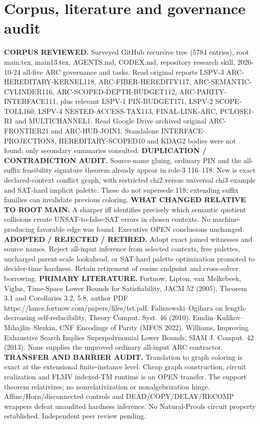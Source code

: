 \documentclass[11pt]{article}
\begin{document}
\section{Corpus, literature and governance audit}
\noindent\textbf{CORPUS REVIEWED.} Surveyed GitHub recursive tree (5784 entries), root main.tex, main13.tex, AGENTS.md, CODEX.md, repository research skill, 2026-10-24 all-five ARC governance and tasks. Read original reports LSPV-3 ARC-HEREDITARY-KERNEL118, ARC-FIBER-HEREDITY117, ARC-SEMANTIC-CYLINDER116, ARC-SCOPED-DEPTH-BUDGET112, ARC-PARITY-INTERFACE111, plus relevant LSPV-1 PIN-BUDGET171, LSPV-2 SCOPE-TOLL160, LSPV-4 NESTED-ACCESS-TAX113, FINAL-LINK-ARC, PCLOSE1-R1 and MULTICHANNEL1. Read Google Drive archived original ARC-FRONTIER21 and ARC-HUB-JOIN1. Standalone INTERFACE-PROJECTION8, HEREDITARY-SCOPED10 and KDAG2 bodies were not found; only secondary summaries consulted.
\noindent\textbf{DUPLICATION / CONTRADICTION AUDIT.} Source-name gluing, ordinary PIN and the all-suffix feasibility signature theorem already appear in role-3 116--118. New is exact declared-context conflict graph, with restricted chi2 versus universal chi3 example and SAT-hard implicit palette. These do not supersede 118; extending suffix families can invalidate previous coloring.
\noindent\textbf{WHAT CHANGED RELATIVE TO ROOT MAIN.} A sharper iff identifies precisely which semantic quotient collisions create UNSAT-to-false-SAT errors in chosen contexts. No machine-producing favorable edge was found. Executive OPEN conclusions unchanged.
\noindent\textbf{ADOPTED / REJECTED / RETIRED.} Adopt exact joined witnesses and source names. Reject all-input inference from selected contexts, free palettes, uncharged parent-scale lookahead, or SAT-hard palette optimization promoted to decider-time hardness. Retain retirement of cosine endpoint and cross-solver borrowing.
\noindent\textbf{PRIMARY LITERATURE.} Fortnow, Lipton, van Melkebeek, Viglas, Time-Space Lower Bounds for Satisfiability, JACM 52 (2005), Theorem 3.1 and Corollaries 3.2, 5.8, author PDF https://lance.fortnow.com/papers/files/tst.pdf. Faliszewski--Ogihara on length-decreasing self-reducibility, Theory Comput. Syst. 46 (2010). Emdin--Kulikov--Mihajlin--Slezkin, CNF Encodings of Parity (MFCS 2022). Williams, Improving Exhaustive Search Implies Superpolynomial Lower Bounds, SIAM J. Comput. 42 (2013). None supplies the unproved ordinary all-input ARC contractor.
\noindent\textbf{TRANSFER AND BARRIER AUDIT.} Translation to graph coloring is exact at the extensional finite-instance level. Cheap graph construction, circuit realization and FLMV indexed-TM runtime is an OPEN transfer. The support theorem relativizes; no nonrelativization or nonalgebrization hinge. Affine/Horn/disconnected controls and DEAD/COPY/DELAY/RECOMP wrappers defeat unaudited hardness inference. No Natural-Proofs circuit property established. Independent peer review pending.
\end{document}
